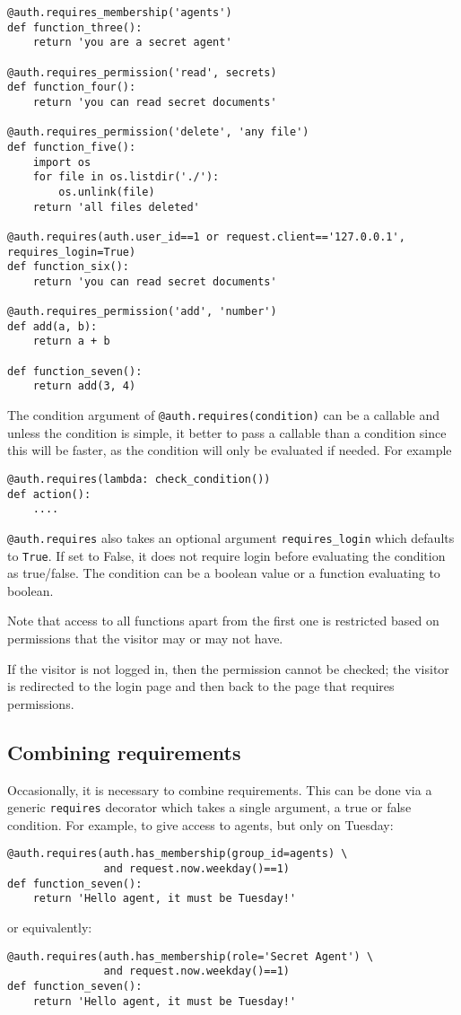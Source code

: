 \documentclass[justified,sixbynine,notoc]{tufte-book}
\def\ft{\small\tt}
\begin{document}
\begin{fullwidth}
\begin{lstlisting}
@auth.requires_membership('agents')
def function_three():
    return 'you are a secret agent'

@auth.requires_permission('read', secrets)
def function_four():
    return 'you can read secret documents'

@auth.requires_permission('delete', 'any file')
def function_five():
    import os
    for file in os.listdir('./'):
        os.unlink(file)
    return 'all files deleted'

@auth.requires(auth.user_id==1 or request.client=='127.0.0.1', requires_login=True)
def function_six():
    return 'you can read secret documents'

@auth.requires_permission('add', 'number')
def add(a, b):
    return a + b

def function_seven():
    return add(3, 4)
\end{lstlisting}

The condition argument of {\ft @auth.requires(condition)} can be a callable and unless the condition is simple, it better to pass a callable than a condition since this will be faster, as the condition will only be evaluated if needed. For example

\begin{lstlisting}
@auth.requires(lambda: check_condition())
def action():
    ....
\end{lstlisting}

{\ft @auth.requires} also takes an optional argument {\ft requires\_login} which defaults to {\ft True}. If set to False, it does not require login before evaluating the condition as true/false. The condition can be a boolean value or a function evaluating to boolean.

Note that access to all functions apart from the first one is restricted based on permissions that the visitor may or may not have.

If the visitor is not logged in, then the permission cannot be checked; the visitor is redirected to the login page and then back to the page that requires permissions.

\goodbreak\subsection{Combining requirements}

Occasionally, it is necessary to combine requirements. This can be done via a generic {\ft requires} decorator which takes a single argument, a true or false condition. For example, to give access to agents, but only on Tuesday:
\begin{lstlisting}
@auth.requires(auth.has_membership(group_id=agents) \
               and request.now.weekday()==1)
def function_seven():
    return 'Hello agent, it must be Tuesday!'
\end{lstlisting}
\noindent or equivalently:
\begin{lstlisting}
@auth.requires(auth.has_membership(role='Secret Agent') \
               and request.now.weekday()==1)
def function_seven():
    return 'Hello agent, it must be Tuesday!'
\end{lstlisting}


\end{fullwidth}
\end{document}
